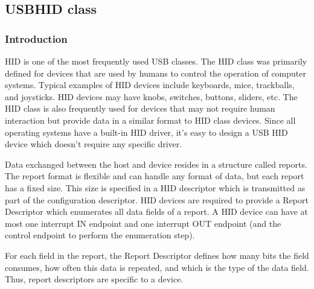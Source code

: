 \documentclass[pdftex,10pt,a4paper]{report}
\begin{document}
\subsection{USBHID class}
\subsubsection{Introduction}
HID is one of the most frequently used USB classes. The HID class was primarily defined for devices that are used by humans to control the operation of computer systems. Typical examples of HID devices include keyboards, mice, trackballs, and joysticks. HID devices may have knobs, switches, buttons, sliders, etc. The HID class is also frequently used for devices that may not require human interaction but provide data in a similar format to HID class devices. Since all operating systems have a built-in HID driver, it's easy to design a USB HID device which doesn't require any specific driver.

Data exchanged between the host and device resides in a structure called reports. The report format is flexible and can handle any format of data, but each report has a fixed size. This size is specified in a HID descriptor which is transmitted as part of the configuration descriptor.
HID devices are required to provide a Report Descriptor which enumerates all data fields of a report. A HID device can have at most one interrupt IN endpoint and one interrupt OUT endpoint (and the control endpoint to perform the enumeration step).

For each field in the report, the Report Descriptor defines how many bits the field consumes, how often this data is repeated, and which is the type of the data field. Thus, report descriptors are specific to a device.
\\
\end{document}
